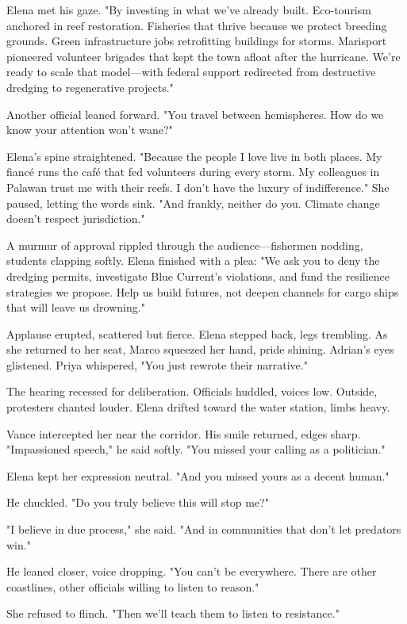 Elena met his gaze. "By investing in what we've already built. Eco-tourism anchored in reef restoration. Fisheries that thrive because we protect breeding grounds. Green infrastructure jobs retrofitting buildings for storms. Marisport pioneered volunteer brigades that kept the town afloat after the hurricane. We're ready to scale that model—with federal support redirected from destructive dredging to regenerative projects."

Another official leaned forward. "You travel between hemispheres. How do we know your attention won't wane?"

Elena's spine straightened. "Because the people I love live in both places. My fiancé runs the café that fed volunteers during every storm. My colleagues in Palawan trust me with their reefs. I don't have the luxury of indifference." She paused, letting the words sink. "And frankly, neither do you. Climate change doesn't respect jurisdiction."

A murmur of approval rippled through the audience—fishermen nodding, students clapping softly. Elena finished with a plea: "We ask you to deny the dredging permits, investigate Blue Current's violations, and fund the resilience strategies we propose. Help us build futures, not deepen channels for cargo ships that will leave us drowning."

Applause erupted, scattered but fierce. Elena stepped back, legs trembling. As she returned to her seat, Marco squeezed her hand, pride shining. Adrian's eyes glistened. Priya whispered, "You just rewrote their narrative."

The hearing recessed for deliberation. Officials huddled, voices low. Outside, protesters chanted louder. Elena drifted toward the water station, limbs heavy.

Vance intercepted her near the corridor. His smile returned, edges sharp. "Impassioned speech," he said softly. "You missed your calling as a politician."

Elena kept her expression neutral. "And you missed yours as a decent human."

He chuckled. "Do you truly believe this will stop me?"

"I believe in due process," she said. "And in communities that don't let predators win."

He leaned closer, voice dropping. "You can't be everywhere. There are other coastlines, other officials willing to listen to reason."

She refused to flinch. "Then we'll teach them to listen to resistance."

